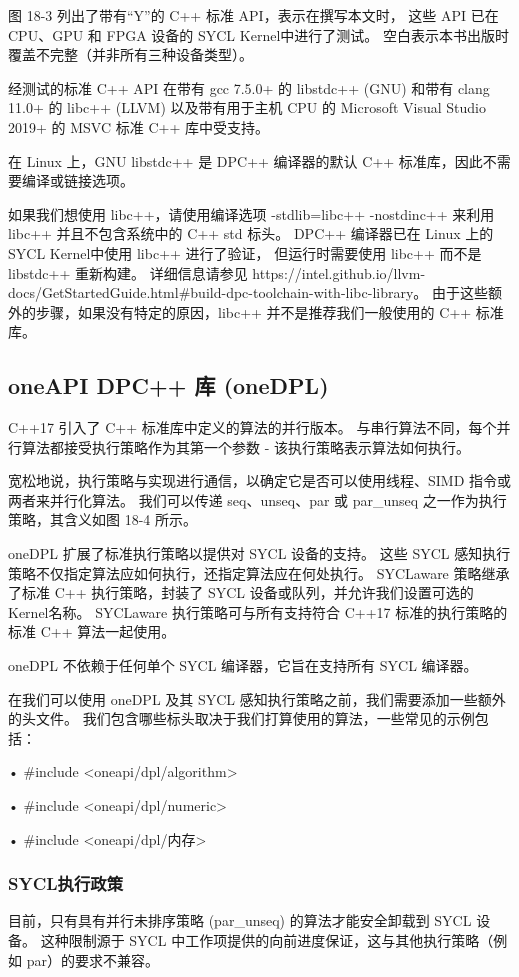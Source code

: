 图 18-3 列出了带有“Y”的 C++ 标准 API，表示在撰写本文时，
这些 API 已在 CPU、GPU 和 FPGA 设备的 SYCL Kernel中进行了测试。 
空白表示本书出版时覆盖不完整（并非所有三种设备类型）。

经测试的标准 C++ API 在带有 gcc 7.5.0+ 的 libstdc++ (GNU) 
和带有 clang 11.0+ 的 libc++ (LLVM) 
以及带有用于主机 CPU 的 Microsoft Visual Studio 2019+ 的 MSVC 标准 C++ 库中受支持。

在 Linux 上，GNU libstdc++ 是 DPC++ 编译器的默认 C++ 标准库，因此不需要编译或链接选项。

如果我们想使用 libc++，请使用编译选项 -stdlib=libc++ -nostdinc++ 来利用 libc++ 
并且不包含系统中的 C++ std 标头。 
DPC++ 编译器已在 Linux 上的 SYCL Kernel中使用 libc++ 进行了验证，
但运行时需要使用 libc++ 而不是 libstdc++ 重新构建。 
详细信息请参见 https://intel.github.io/llvm-docs/GetStartedGuide.html\#build-dpc-toolchain-with-libc-library。 
由于这些额外的步骤，如果没有特定的原因，libc++ 并不是推荐我们一般使用的 C++ 标准库。

\subsection{oneAPI DPC++ 库 (oneDPL)}
C++17 引入了 C++ 标准库中定义的算法的并行版本。 
与串行算法不同，每个并行算法都接受执行策略作为其第一个参数 - 该执行策略表示算法如何执行。

宽松地说，执行策略与实现进行通信，以确定它是否可以使用线程、SIMD 指令或两者来并行化算法。 
我们可以传递 seq、unseq、par 或 par\_unseq 之一作为执行策略，其含义如图 18-4 所示。

oneDPL 扩展了标准执行策略以提供对 SYCL 设备的支持。 
这些 SYCL 感知执行策略不仅指定算法应如何执行，还指定算法应在何处执行。 
SYCLaware 策略继承了标准 C++ 执行策略，封装了 SYCL 设备或队列，并允许我们设置可选的Kernel名称。 
SYCLaware 执行策略可与所有支持符合 C++17 标准的执行策略的标准 C++ 算法一起使用。

oneDPL 不依赖于任何单个 SYCL 编译器，它旨在支持所有 SYCL 编译器。

在我们可以使用 oneDPL 及其 SYCL 感知执行策略之前，我们需要添加一些额外的头文件。 
我们包含哪些标头取决于我们打算使用的算法，一些常见的示例包括：

• \#include <oneapi/dpl/algorithm>

• \#include <oneapi/dpl/numeric>

• \#include <oneapi/dpl/内存>

\subsubsection{SYCL执行政策}
目前，只有具有并行未排序策略 (par\_unseq) 的算法才能安全卸载到 SYCL 设备。 
这种限制源于 SYCL 中工作项提供的向前进度保证，这与其他执行策略（例如 par）的要求不兼容。

